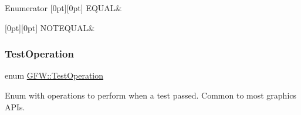 \begin{DoxyEnumFields}{Enumerator}
[0pt][0pt]{}\mbox{\label{namespace_g_f_w_a2eabb5a646179bceaab2d5e3bfce2316a969f331a87d8c958473c32b4d0e61a44}} 
E\+Q\+U\+AL&\\
\hline

[0pt][0pt]{}\mbox{\label{namespace_g_f_w_a2eabb5a646179bceaab2d5e3bfce2316a94fbd04a26dff1689ee02634be6aaf1f}} 
N\+O\+T\+E\+Q\+U\+AL&\\
\hline

\end{DoxyEnumFields}
\mbox{\label{namespace_g_f_w_a6a4cd1647d3100386320b711cdda20d4}} 
\subsubsection{\texorpdfstring{Test\+Operation}{TestOperation}}
{\footnotesize\ttfamily enum \hyperlink{namespace_g_f_w_a6a4cd1647d3100386320b711cdda20d4}{G\+F\+W\+::\+Test\+Operation}\hspace{0.3cm}{\ttfamily [strong]}}



Enum with operations to perform when a test passed. Common to most graphics A\+P\+Is. 

